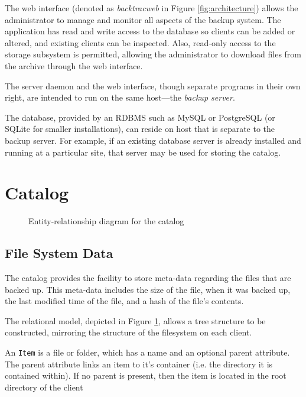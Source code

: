 The web interface (denoted as \emph{backtracweb} in Figure
\ref{fig:architecture}) allows the administrator to manage and monitor all
aspects of the backup system. The application has read and write access to the
database so clients can be added or altered, and existing clients can be
inspected. Also, read-only access to the storage subsystem is permitted,
allowing the administrator to download files from the archive through the web
interface.

The server daemon and the web interface, though separate programs in their own
right, are intended to run on the same host---the \emph{backup server}.

The database, provided by an RDBMS such as MySQL or PostgreSQL (or SQLite for
smaller installations), can reside on host that is separate to the backup
server. For example, if an existing database server is already installed and
running at a particular site, that server may be used for storing the catalog.

\section{Catalog}

\begin{figure}
    \begin{center}
        \newlength{\svgwidth}
        \setlength{\svgwidth}{1.1\textwidth}
        \tiny
        
    \end{center}
    \caption{Entity-relationship diagram for the catalog}
    \label{fig:erd}
\end{figure}

\subsection{File System Data}

The catalog provides the facility to store meta-data regarding the files that
are backed up. This meta-data includes the size of the file, when it was backed
up, the last modified time of the file, and a hash of the file's contents.

The relational model, depicted in Figure \ref{fig:erd}, allows a tree structure
to be constructed, mirroring the structure of the filesystem on each client.

An \verb!Item! is a file or folder, which has a name and an optional parent
attribute. The parent attribute links an item to it's container (i.e. the
directory it is contained within). If no parent is present, then the item is
located in the root directory of the client

